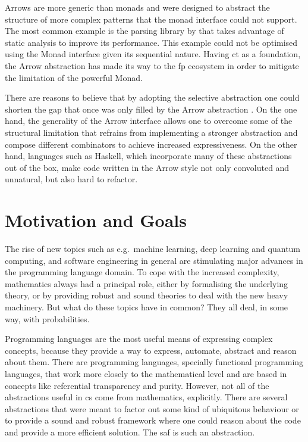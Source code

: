\documentclass[
  oneside,
  11pt, a4paper,
  footinclude=true,
  headinclude=true,
  cleardoublepage=empty
]{scrbook}
\theoremstyle{definition}
\theoremstyle{definition}
\begin{document}
    Arrows \citep{Hughes:2000:GMA:347238.347246} are more generic than monads and were designed to abstract the structure of more complex patterns that the monad interface could not support. The most common example is the parsing library by \cite{swiestra&duponcheel} that takes advantage of static analysis to improve its performance. This example could not be optimised using the Monad interface given its sequential nature. Having \gls{ct} as a foundation, the Arrow abstraction has made its way to the \gls{fp} ecosystem in order to mitigate the limitation of the powerful Monad.
    
    There are reasons to believe that by adopting the selective abstraction one could shorten the gap that once was only filled by the Arrow abstraction \citep{Hughes:2000:GMA:347238.347246}. On the one hand, the generality of the Arrow interface allows one to overcome some of the structural limitation that refrains from implementing a stronger abstraction and compose different combinators to achieve increased expressiveness. On the other hand, languages such as Haskell, which incorporate many of these abstractions out of the box, make code written in the Arrow style not only convoluted and unnatural, but also hard to refactor.
    
    \section{Motivation and Goals}\label{sec-moti-goals}
    
    The rise of new topics such as e.g.\ machine learning, deep learning and quantum computing, and software engineering in general are stimulating major advances in the programming language domain. To cope with the increased complexity, mathematics always had a principal role, either by formalising the underlying theory, or by providing robust and sound theories to deal with the new heavy machinery. But what do these topics have in common? They all deal, in some way, with probabilities. 
	    
	Programming languages are the most useful means of expressing complex concepts, because they provide a way to express, automate, abstract and reason about them. There are programming languages, specially functional programming languages, that work more closely to the mathematical level and are based in concepts like referential transparency and purity. 
	However, not all of the abstractions useful in \gls{cs} come from mathematics, explicitly. There are several abstractions that were meant to factor out some kind of ubiquitous behaviour or to provide a sound and robust framework where one could reason about the code and provide a more efficient solution. The \gls{saf} is such an abstraction.
	    
\end{document}
